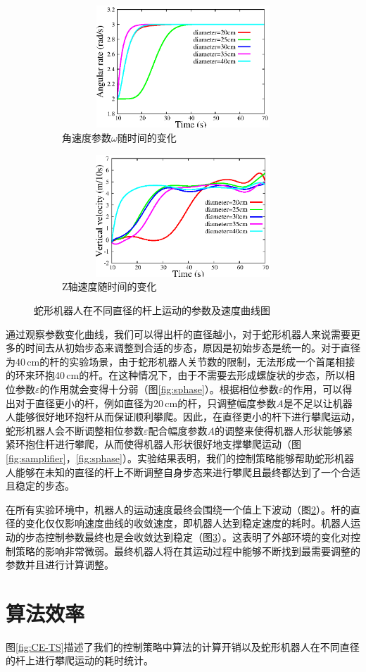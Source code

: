 \begin{figure}[htbp]
\begin{subfigure}{0.45\textwidth}{
			\centering
			\includegraphics[width=1\textwidth,height=130pt]{figure/chap05/sarate.eps}	
			\caption{角速度参数$\omega$随时间的变化}
			\label{fig:sarate}
		}
	\end{subfigure}
	\begin{subfigure}{0.45\textwidth}{
			\centering
			\includegraphics[width=1\textwidth,height=130pt]{figure/chap05/svel.eps}
			\caption{Z轴速度随时间的变化}
			\label{fig:svelocity}
		}
	\end{subfigure}
	\caption{蛇形机器人在不同直径的杆上运动的参数及速度曲线图}
	\label{fig:scurve}
\end{figure}

通过观察参数变化曲线，我们可以得出杆的直径越小，对于蛇形机器人来说需要更多的时间去从初始步态来调整到合适的步态，原因是初始步态是统一的。对于直径为40\,cm的杆的实验场景，由于蛇形机器人关节数的限制，无法形成一个首尾相接的环来环抱40\,cm的杆。在这种情况下，由于不需要去形成螺旋状的步态，所以相位参数$\varepsilon$的作用就会变得十分弱（图\ref{fig:sphase}）。根据相位参数$\varepsilon$的作用，可以得出对于直径更小的杆，例如直径为20\,cm的杆，只调整幅度参数$A$是不足以让机器人能够很好地环抱杆从而保证顺利攀爬。因此，在直径更小的杆下进行攀爬运动，蛇形机器人会不断调整相位参数$\varepsilon$配合幅度参数$A$的调整来使得机器人形状能够紧紧环抱住杆进行攀爬，从而使得机器人形状很好地支撑攀爬运动（图\ref{fig:samplifier}，\ref{fig:sphase}）。实验结果表明，我们的控制策略能够帮助蛇形机器人能够在未知的直径的杆上不断调整自身步态来进行攀爬且最终都达到了一个合适且稳定的步态。

在所有实验环境中，机器人的运动速度最终会围绕一个值上下波动（图\ref{fig:svelocity}）。杆的直径的变化仅仅影响速度曲线的收敛速度，即机器人达到稳定速度的耗时。机器人运动的步态控制参数最终也是会收敛达到稳定（图\ref{fig:scurve}）。这表明了外部环境的变化对控制策略的影响非常微弱。最终机器人将在其运动过程中能够不断找到最需要调整的参数并且进行计算调整。



\section{算法效率}
图\ref{fig:CE-TS}描述了我们的控制策略中算法的计算开销以及蛇形机器人在不同直径的杆上进行攀爬运动的耗时统计。

